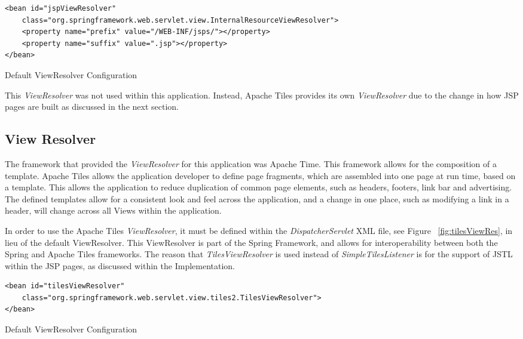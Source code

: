 \begin{lstlisting}
<bean id="jspViewResolver"
	class="org.springframework.web.servlet.view.InternalResourceViewResolver">
	<property name="prefix" value="/WEB-INF/jsps/"></property>
	<property name="suffix" value=".jsp"></property>
</bean>
\end{lstlisting}
\begin{table}[H]
\caption{Default ViewResolver Configuration}
\label{fig:defaultViewRes}
\end{table}

This \textit{ViewResolver} was not used within this application. Instead, Apache Tiles provides its own \textit{ViewResolver} due to the change in how JSP pages are built as discussed in the next section.

\subsection{View Resolver}

The framework that provided the \textit{ViewResolver} for this application was Apache Time. This framework allows for the composition of a template. Apache Tiles allows the application developer to define page fragments, which are assembled into one page at run time, based on a template. This allows the application to reduce duplication of common page elements, such as headers, footers, link bar and advertising.  The defined templates allow for a consistent look and feel across the application, and a change in one place, such as modifying a link in a header, will change across all Views within the application.

In order to use the Apache Tiles \textit{ViewResolver}, it must be defined within the \textit{DispatcherServlet} XML file, see Figure ~\ref{fig:tilesViewRes}, in lieu of the default ViewResolver. This ViewResolver is part of the Spring Framework, and allows for interoperability between both the Spring and Apache Tiles frameworks. The reason that \textit{TilesViewResolver} is used instead of \textit{SimpleTilesListener} is for the support of JSTL within the JSP pages, as discussed within the Implementation.

\begin{lstlisting}
<bean id="tilesViewResolver"
	class="org.springframework.web.servlet.view.tiles2.TilesViewResolver">
</bean>
\end{lstlisting}
\begin{table}[H]
\caption{Default ViewResolver Configuration}
\label{fig:tilesViewRes}
\end{table}

